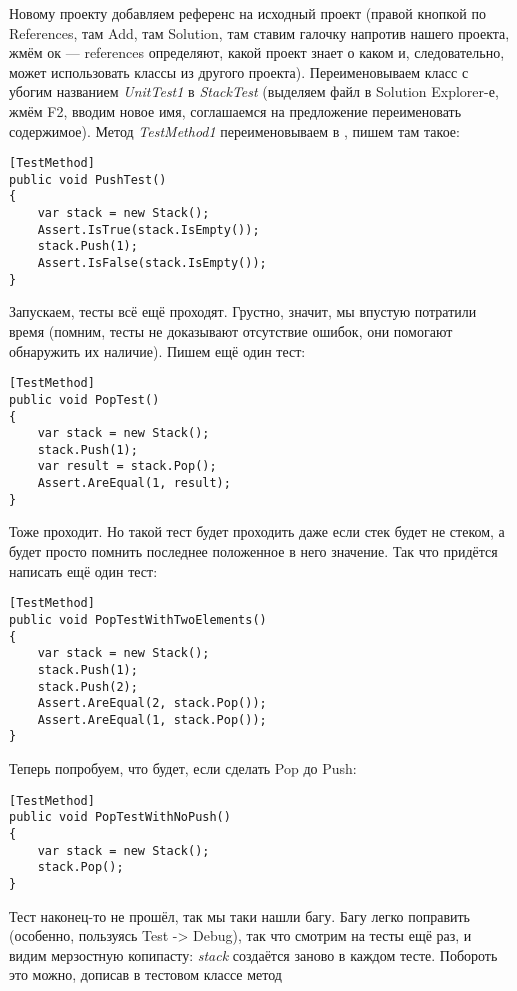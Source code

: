 \documentclass[a5paper]{article}
\begin{document}
Новому проекту добавляем референс на исходный проект (правой кнопкой по References, там Add, там Solution, там ставим галочку напротив нашего проекта, жмём ок --- references определяют, какой проект знает о каком и, следовательно, может использовать классы из другого проекта). Переименовываем класс с убогим названием \textit{UnitTest1} в \textit{StackTest} (выделяем файл в Solution Explorer-е, жмём F2, вводим новое имя, соглашаемся на предложение переименовать содержимое). Метод \textit{TestMethod1} переименовываем в , пишем там такое:

\begin{verbatim}
[TestMethod]
public void PushTest()
{
    var stack = new Stack();
    Assert.IsTrue(stack.IsEmpty());
    stack.Push(1);
    Assert.IsFalse(stack.IsEmpty());
}
\end{verbatim}

Запускаем, тесты всё ещё проходят. Грустно, значит, мы впустую потратили время (помним, тесты не доказывают отсутствие ошибок, они помогают обнаружить их наличие). Пишем ещё один тест:

\begin{verbatim}
[TestMethod]
public void PopTest()
{
    var stack = new Stack();
    stack.Push(1);
    var result = stack.Pop();
    Assert.AreEqual(1, result);
}
\end{verbatim}

Тоже проходит. Но такой тест будет проходить даже если стек будет не стеком, а будет просто помнить последнее положенное в него значение. Так что придётся написать ещё один тест:

\begin{verbatim}
[TestMethod]
public void PopTestWithTwoElements()
{
    var stack = new Stack();
    stack.Push(1);
    stack.Push(2);
    Assert.AreEqual(2, stack.Pop());
    Assert.AreEqual(1, stack.Pop());
}
\end{verbatim}

Теперь попробуем, что будет, если сделать Pop до Push:

\begin{verbatim}
[TestMethod]
public void PopTestWithNoPush()
{
    var stack = new Stack();
    stack.Pop();
}
\end{verbatim}

Тест наконец-то не прошёл, так мы таки нашли багу. Багу легко поправить (особенно, пользуясь Test -> Debug), так что смотрим на тесты ещё раз, и видим мерзостную копипасту: \textit{stack} создаётся заново в каждом тесте. Побороть это можно, дописав в тестовом классе метод 
\end{document}
